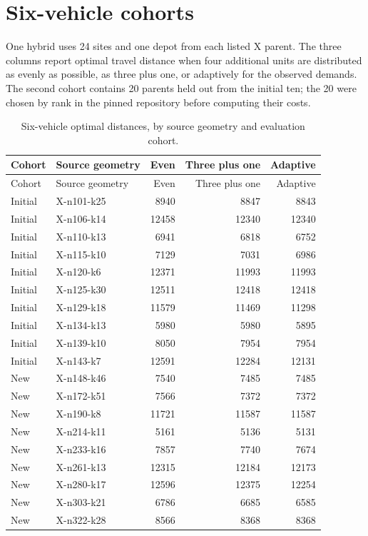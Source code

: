 \documentclass[runningheads]{llncs}
\begin{document}
\section{Six-vehicle cohorts}
One hybrid uses 24 sites and one depot from each listed X parent. The three columns report optimal travel distance when four additional units are distributed as evenly as possible, as three plus one, or adaptively for the observed demands. The second cohort contains 20 parents held out from the initial ten; the 20 were chosen by rank in the pinned repository before computing their costs.
\begingroup\small
\begin{longtable}{llrrr}
\caption{Six-vehicle optimal distances, by source geometry and evaluation cohort.}\\
\toprule Cohort & Source geometry & Even & Three plus one & Adaptive\\\midrule\endfirsthead
\toprule Cohort & Source geometry & Even & Three plus one & Adaptive\\\midrule\endhead
\bottomrule\endfoot
Initial & X-n101-k25 & 8940 & 8847 & 8843 \\
Initial & X-n106-k14 & 12458 & 12340 & 12340 \\
Initial & X-n110-k13 & 6941 & 6818 & 6752 \\
Initial & X-n115-k10 & 7129 & 7031 & 6986 \\
Initial & X-n120-k6 & 12371 & 11993 & 11993 \\
Initial & X-n125-k30 & 12511 & 12418 & 12418 \\
Initial & X-n129-k18 & 11579 & 11469 & 11298 \\
Initial & X-n134-k13 & 5980 & 5980 & 5895 \\
Initial & X-n139-k10 & 8050 & 7954 & 7954 \\
Initial & X-n143-k7 & 12591 & 12284 & 12131 \\
New & X-n148-k46 & 7540 & 7485 & 7485 \\
New & X-n172-k51 & 7566 & 7372 & 7372 \\
New & X-n190-k8 & 11721 & 11587 & 11587 \\
New & X-n214-k11 & 5161 & 5136 & 5131 \\
New & X-n233-k16 & 7857 & 7740 & 7674 \\
New & X-n261-k13 & 12315 & 12184 & 12173 \\
New & X-n280-k17 & 12596 & 12375 & 12254 \\
New & X-n303-k21 & 6786 & 6685 & 6585 \\
New & X-n322-k28 & 8566 & 8368 & 8368 \\

\end{longtable}
\end{document}
